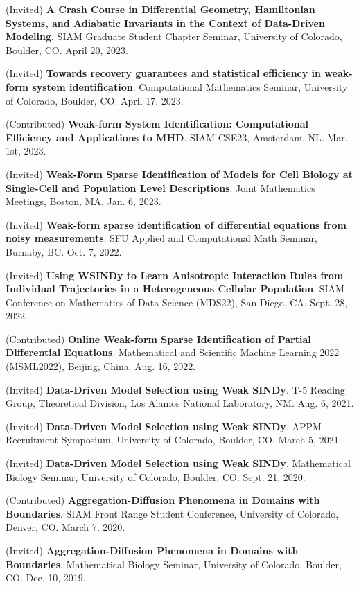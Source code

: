 \documentclass[letterpaper,11pt,oneside]{article}
\begin{document}
\begin{enumerate}[label={[\arabic*]}]
\item (Invited) \textbf{A Crash Course in Differential Geometry, Hamiltonian Systems, and Adiabatic Invariants in the Context of Data-Driven Modeling}. SIAM Graduate Student Chapter Seminar, University of Colorado, Boulder, CO. April 20, 2023.
\item (Invited) \textbf{Towards recovery guarantees and statistical efficiency in weak-form system identification}. Computational Mathematics Seminar, University of Colorado, Boulder, CO. April 17, 2023.
\item (Contributed) \textbf{Weak-form System Identification: Computational Efficiency and Applications to MHD}. SIAM CSE23, Amsterdam, NL. Mar. 1st, 2023.
\item (Invited) \textbf{Weak-Form Sparse Identification of Models for Cell Biology at Single-Cell and Population Level Descriptions}. Joint Mathematics Meetings, Boston, MA. Jan. 6, 2023.
\item (Invited) \textbf{Weak-form sparse identification of differential equations from noisy measurements}. SFU Applied and Computational Math Seminar, Burnaby, BC. Oct. 7, 2022.
\item (Invited) \textbf{Using WSINDy to Learn Anisotropic Interaction 
Rules from Individual Trajectories in a Heterogeneous Cellular Population}. SIAM Conference on Mathematics of Data Science (MDS22), San Diego, CA. Sept. 28, 2022.
\item (Contributed) \textbf{Online Weak-form Sparse Identification of Partial Differential Equations}. Mathematical and Scientific Machine Learning 2022 (MSML2022), Beijing, China. Aug. 16, 2022.
\item (Invited) \textbf{Data-Driven Model Selection using Weak SINDy}. T-5 Reading Group, Theoretical Division, Los Alamos National Laboratory, NM. Aug. 6, 2021.
\item (Invited) \textbf{Data-Driven Model Selection using Weak SINDy}. APPM Recruitment Symposium, University of Colorado, Boulder, CO. March 5, 2021.
\item (Invited) \textbf{Data-Driven Model Selection using Weak SINDy}. Mathematical Biology Seminar, University of Colorado, Boulder, CO. Sept. 21, 2020.
\item (Contributed) \textbf{Aggregation-Diffusion Phenomena in Domains with Boundaries}. SIAM Front Range Student Conference, University of Colorado, Denver, CO. March 7, 2020.
\item (Invited) \textbf{Aggregation-Diffusion Phenomena in Domains with Boundaries}. Mathematical Biology Seminar, University of Colorado, Boulder, CO. Dec. 10, 2019.

\end{enumerate}
\end{document}

